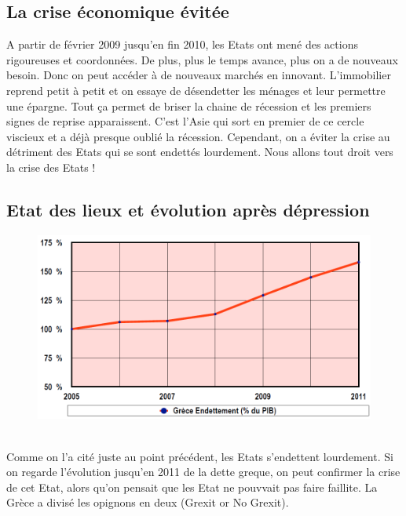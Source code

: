 \subsection{La crise économique évitée}
A partir de février 2009 jusqu'en fin 2010, les Etats ont mené des actions rigoureuses et coordonnées. De plus, plus le temps avance, plus on a de nouveaux besoin. Donc on peut accéder à de nouveaux marchés en innovant. L'immobilier reprend petit à petit et on essaye de désendetter les ménages et leur permettre une épargne. Tout ça permet de briser la chaine de récession et les premiers signes de reprise apparaissent. C'est l'Asie qui sort en premier de ce cercle viscieux et a déjà presque oublié la récession. Cependant, on a éviter la crise au détriment des Etats qui se sont endettés lourdement. Nous allons tout droit vers la crise des Etats !

\subsection{Etat des lieux et évolution après dépression}
\begin{figure}
	\includegraphics[scale=0.28]{24}
\end{figure}
\ \\ Comme on l'a cité juste au point précédent, les Etats s'endettent lourdement. Si on regarde l'évolution jusqu'en 2011 de la dette greque, on peut confirmer la crise de cet Etat, alors qu'on pensait que les Etat ne pouvvait pas faire faillite. La Grèce a divisé les opignons en deux (Grexit or No Grexit). 

